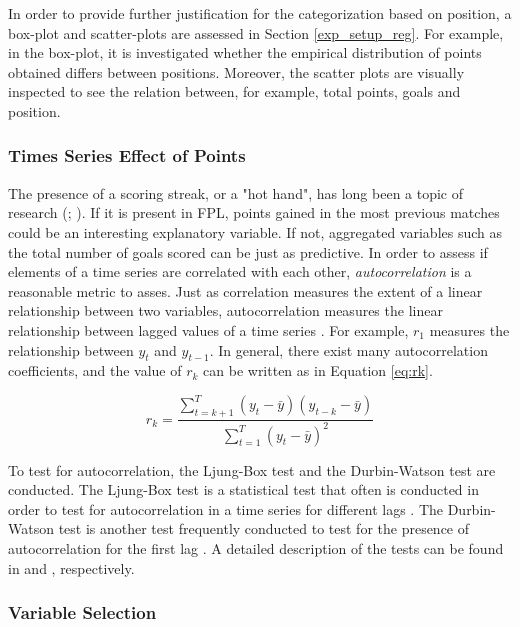 \newpar

In order to provide further justification for the categorization based on position, a box-plot and scatter-plots are assessed in Section \ref{exp_setup_reg}. For example, in the box-plot, it is investigated whether the empirical distribution of points obtained differs between positions. Moreover, the scatter plots are visually inspected to see the relation between, for example, total points, goals and position.

\subsubsection{Times Series Effect of Points}

The presence of a scoring streak, or a "hot hand", has long been a topic of research (\cite{hot_hand}; \cite{hot_hand_2}). If it is present in FPL, points gained in the most previous matches could be an interesting explanatory variable. If not, aggregated variables such as the total number of goals scored can be just as predictive. In order to assess if elements of a time series are correlated with each other, \textit{autocorrelation} is a reasonable metric to asses. Just as correlation measures the extent of a linear relationship between two variables, autocorrelation measures the linear relationship between lagged values of a time series \citep{Hyndman}. For example, $r_1$ measures the relationship between $y_t$ and $y_{t-1}$. In general, there exist many autocorrelation coefficients, and the value of $r_k$ can be written as in Equation \ref{eq:rk}. 


\begin{equation}\label{eq:rk}
    r_k = \frac{\sum_{t=k+1}^T(y_t-\bar{y})(y_{t-k}-\bar{y})}{\sum_{t=1}^T(y_t-\bar{y})^2}
\end{equation}

To test for autocorrelation, the Ljung-Box test and the Durbin-Watson test are conducted. The Ljung-Box test is a statistical test that often is conducted in order to test for autocorrelation in a time series for different lags \citep{Hyndman}. The Durbin-Watson test is another test frequently conducted to test for the presence of autocorrelation for the first lag \citep{Carol_1}. A detailed description of the tests can be found in \cite{Hyndman} and \cite{Carol_1}, respectively.

\subsubsection{Variable Selection}

